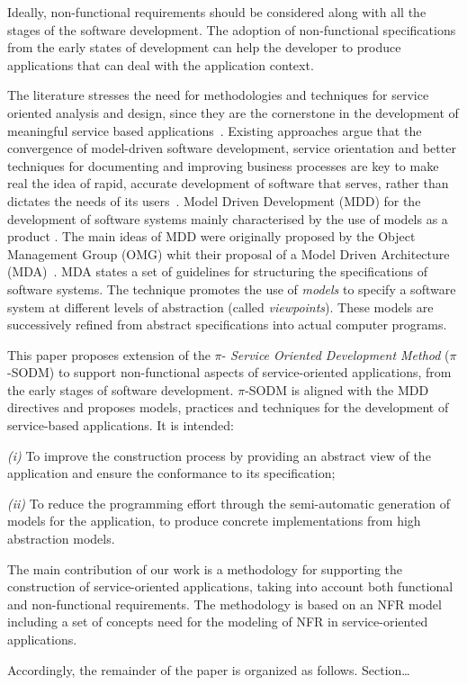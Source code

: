 Ideally, non-functional requirements should be considered along with all the stages of the software development.
The adoption of non-functional specifications from the early states of development
can help the developer to produce applications that  can deal with
the application context.

The literature stresses the need for methodologies and techniques for service oriented analysis and design, since they are the cornerstone in the development of meaningful service based applications~\cite{5}. Existing approaches argue that the convergence of model-driven software development, service orientation and better techniques for documenting and improving business processes are key to make real the idea of rapid, accurate development of software that serves, rather than dictates the needs of its users~\cite{watson}. Model Driven Development (MDD)  for the development of software systems mainly characterised by the use of models as a product \cite{Selic03}.
The main ideas of MDD were originally proposed by the Object Management Group (OMG) whit their proposal of a Model Driven Architecture (MDA)~\cite{miller}. MDA states a set of guidelines for structuring the specifications of software systems. The technique promotes  the use of \textit{models} to specify a software system at different levels of abstraction (called \textit{viewpoints}).
These models are successively refined from abstract specifications into actual computer programs.

This paper proposes  extension of the $\pi$-\textit{ Service Oriented Development Method} ($\pi$-SODM)
to support non-functional aspects of service-oriented applications, from the early stages of software development.
$\pi$-SODM is aligned with the MDD directives and proposes models, practices and techniques for the development of service-based applications. It is intended:
\begin{trivlist}
\item \textit{(i)} To improve the construction process by providing an abstract view of the application and ensure the conformance to its specification;
\item \textit{(ii)} To reduce the programming effort through the semi-automatic generation of  models for the application, to produce concrete implementations from high abstraction models.
\end{trivlist}

The main contribution of our work is a methodology for supporting the construction of service-oriented applications, taking into account both functional and non-functional requirements. The methodology is based on  an NFR model including a set of concepts need for the modeling of NFR in service-oriented applications.


Accordingly, the remainder of the paper is organized as follows.
Section\dots





